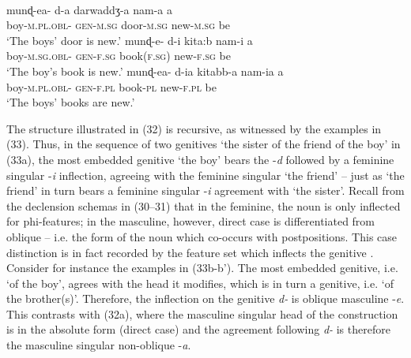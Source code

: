 \documentclass[output=paper]{langsci/langscibook}
\begin{document}
\ea%
    \label{ex:manzini:32}\\
    \begin{xlista}
    \ex
    \gll munɖ-ea-    d-a     darwaddʒ-a   nam-a   a\\
         boy-\textsc{m.pl.obl-}  \textsc{gen-m.sg}  door-\textsc{m.sg}  new-\textsc{m.sg}    be\\
    \glt ‘The boys’ door is new.’
    \ex  
    \gll munɖ-e-    d-i     kita:b     nam-i     a\\
         boy-\textsc{m.sg.obl-}  \textsc{gen-f.sg}   book(\textsc{f.sg)}   new-\textsc{f.sg}   be\\
    \glt ‘The boy’s book is new.’
    \gll munɖ-ea-    d-ia     kitabb-a   nam-ia   a\\
         boy-\textsc{m.pl.obl-}  \textsc{gen-f.pl}   book-\textsc{pl}   new-\textsc{f.pl}   be\\
    \glt ‘The boys’ books are new.’ 
    \end{xlista}
    \z

The structure illustrated in (32) is recursive, as witnessed by the examples in (33). Thus, in the sequence of two genitives ‘the sister of the friend of the boy’ in (33a), the most embedded genitive ‘the boy’ bears the -\textit{d}  followed by a feminine singular -\textit{i} inflection, agreeing with the feminine singular ‘the friend’ – just as ‘the friend’ in turn bears a feminine singular -\textit{i} agreement with ‘the sister’. Recall from the declension schemas in (30--31) that in the feminine, the noun is only inflected for phi-features; in the masculine, however, direct case is differentiated from oblique – i.e. the form of the noun which co-occurs with postpositions. This case distinction is in fact recorded by the feature set which inflects the genitive . Consider for instance the examples in (33b-b’). The most embedded genitive, i.e. ‘of the boy’, agrees with the head it modifies, which is in turn a genitive, i.e. ‘of the brother(s)’. Therefore, the inflection on the genitive  \textit{d-} is oblique masculine -\textit{e}. This contrasts with (32a), where the masculine singular head of the construction is in the absolute form (direct case) and the agreement following \textit{d-} is therefore the masculine singular non-oblique -\textit{a}.
\end{document}
